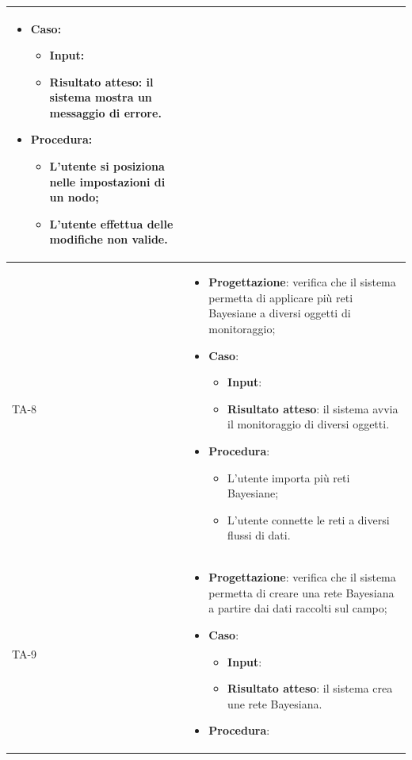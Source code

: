 \begin{longtable}{|C{2.5cm}|C{13cm}|}
\begin{itemize}
	\item \textbf{Caso}: 
	\begin{itemize}
		\item \textbf{Input}:
		\item \textbf{Risultato atteso}: il sistema mostra un messaggio di errore.
	\end{itemize}
	\item \textbf{Procedura}:
	\begin{itemize}
		\item L'utente si posiziona nelle impostazioni di un nodo;
		\item L'utente effettua delle modifiche non valide.
	\end{itemize} 
\end{itemize} \\
\hline
{TA-8} &
\begin{itemize}
	\item \textbf{Progettazione}: verifica che il sistema permetta di applicare più reti Bayesiane a diversi oggetti di monitoraggio;
	\item \textbf{Caso}: 
	\begin{itemize}
		\item \textbf{Input}: 
		\item \textbf{Risultato atteso}: il sistema avvia il monitoraggio di diversi oggetti.
	\end{itemize}
	\item \textbf{Procedura}:
	\begin{itemize}
		\item L'utente importa più reti Bayesiane;
		\item L'utente connette le reti a diversi flussi di dati.
	\end{itemize} 
\end{itemize} \\
\hline
{TA-9} &
\begin{itemize}
	\item \textbf{Progettazione}: verifica che il sistema permetta di creare una rete Bayesiana a partire dai dati raccolti
	sul campo;
	\item \textbf{Caso}: 
	\begin{itemize}
		\item \textbf{Input}:
		\item \textbf{Risultato atteso}: il sistema crea une rete Bayesiana.
	\end{itemize}
	\item \textbf{Procedura}:
	\begin{itemize}

\end{itemize}
\end{itemize}
\end{longtable}
